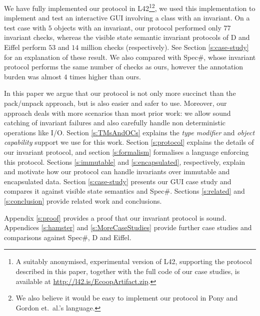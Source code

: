 We have fully implemented our protocol in L42\footnote{A suitably anonymised, experimental version of L42, supporting the protocol described in this paper, together with the full code of our case studies, is available at \url{http://l42.is/EcoopArtifact.zip}.}\footnote{We also believe it would be easy to implement our protocol in Pony and Gordon et.~al.'s language.}, we used this implementation to implement and test an interactive GUI involving a class with an invariant. On a test case with $5$ objects with an invariant, 
our protocol performed only $77$ invariant checks, whereas the visible state semantic invariant protocols of D and Eiffel perform $53$ and $14$ million checks (respectively). See Section \ref{s:case-study} for an explanation of these result.
We also compared with Spec\#, whose invariant protocol performs the same number of checks as ours, however the annotation burden was almost $4$ times higher than ours.


In this paper we argue that our protocol is not only more succinct than the pack/unpack approach, but is also easier and safer to use.
Moreover, our approach deals with more scenarios than most prior work: we allow sound catching of invariant failures and also carefully handle non deterministic operations like I/O.
Section \ref{s:TMsAndOCs} explains the \emph{type modifier} and \emph{object capability} support we use for this work.
Section \ref{s:protocol} explains the details of our invariant protocol, and section \ref{s:formalism} formalises a language enforcing this protocol.
Sections \ref{s:immutable} and \ref{s:encapsulated}, respectively, explain and motivate how our protocol can handle invariants over immutable and encapsulated data.
Section \ref{s:case-study} presents our GUI case study and compares it against visible state semantics and Spec\#.
Sections \ref{s:related} and \ref{s:conclusion} provide related work and conclusions.

Appendix \ref{s:proof} provides a proof that our invariant protocol is sound. Appendices \ref{s:hamster} and \ref{s:MoreCaseStudies} provide further
case studies and comparisons against Spec\#, D and Eiffel.


